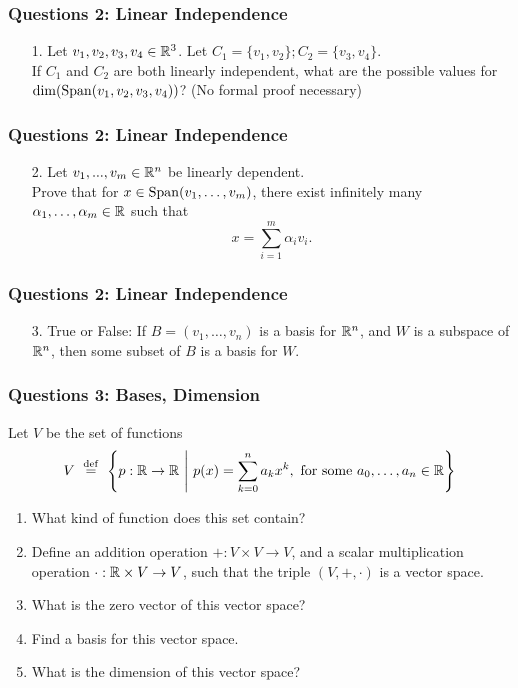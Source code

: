 \documentclass{beamer}
\begin{document}
\begin{frame}[t]
	\frametitle{Questions 2: Linear Independence}
	\grid
	\begin{enumerate}
		\item[1.] Let $v_1,v_2,v_3,v_4 \in \mathbb{R}^3$. Let $C_1 = \{v_1,v_2\}; C_2 = \{v_3,v_4\}$. \\
			If $C_1$ and $C_2$ are both linearly independent, 
			what are the possible values for ${{\rm dim}}({{\rm Span}}(v_1,v_2,v_3,v_4))$? (No formal proof necessary)
	\end{enumerate}
\end{frame}
\begin{frame}[t]
	\frametitle{Questions 2: Linear Independence}
	\grid
	\begin{enumerate}
		\item[2.] Let $v_1,...,v_m \in \mathbb{R}^n$ be linearly dependent. \\
			Prove that for $x \in {{\rm Span}}(v_1,\dots,v_m)$, 
			there exist infinitely many $\alpha_1,\dots,\alpha_m \in \mathbb{R}$ 
			such that 
			\vspace{-0.3cm}
			$$
			x = \sum_{i=1}^m \alpha_i v_i.
			$$
			\pause
	\end{enumerate}
\end{frame}
\begin{frame}[t]
	\frametitle{Questions 2: Linear Independence}
	\grid
	\begin{enumerate}
		\item[3.] True or False: If $B=(v_1,\ldots,v_n)$ is a basis for $\mathbb{R}^n$,
			and $W$ is a subspace of $\mathbb{R}^n$, then some subset of $B$ is a basis
			for $W$.
	\end{enumerate}
\end{frame}


\begin{frame}
	\frametitle{Questions 3: Bases, Dimension}
	Let $V$ be the set of functions \\
	$$V \ \overset{\rm def}{=} \ \left\{ p: \mathbb{R} \to \mathbb{R}\ \middle| \ p(x) = \sum_{k=0}^n a_k x^k, \text{ for some } a_0,\dots,a_n \in \mathbb{R} \right\}$$
	\smallskip
	\begin{enumerate}
		\item What kind of function does this set contain?
		\item Define an addition operation $+: V\times V \to V$,
			and a scalar multiplication operation $\cdot: \mathbb{R} \times V \to V$,
			such that the triple $(V,+,\cdot)$ is a vector space.
		\item What is the zero vector of this vector space?
		\item Find a basis for this vector space.
		\item What is the dimension of this vector space?
	\end{enumerate}
\end{frame}
\end{document}
